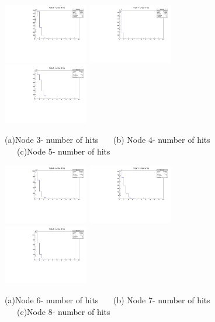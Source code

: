 \documentclass[a4paper,11pt]{article}
\theoremstyle{mytheor}
\begin{document}
\begin{figure}[H] 
\vspace*{-0.3cm} 
\includegraphics[width=0.33\textwidth,scale=0.5,trim=0 0 0 0,clip]{plotsdir/file0_test-N3nhits-1.pdf} 
\includegraphics[width=0.33\textwidth,scale=0.5,trim=0 0 0 0,clip]{plotsdir/file0_test-N4nhits-1.pdf} 
\includegraphics[width=0.33\textwidth,scale=0.5,trim=0 0 0 0,clip]{plotsdir/file0_test-N5nhits-1.pdf} 
\caption{(a)Node 3- number of hits ~~~(b) Node 4- number of hits ~~~(c)Node 5- number of hits } 
\end{figure} 
\begin{figure}[H] 
\vspace*{-0.3cm} 
\includegraphics[width=0.33\textwidth,scale=0.5,trim=0 0 0 0,clip]{plotsdir/file0_test-N6nhits-1.pdf} 
\includegraphics[width=0.33\textwidth,scale=0.5,trim=0 0 0 0,clip]{plotsdir/file0_test-N7nhits-1.pdf} 
\includegraphics[width=0.33\textwidth,scale=0.5,trim=0 0 0 0,clip]{plotsdir/file0_test-N8nhits-1.pdf} 
\caption{(a)Node 6- number of hits ~~~(b) Node 7- number of hits ~~~(c)Node 8- number of hits } 
\end{figure} 
\end{document}
